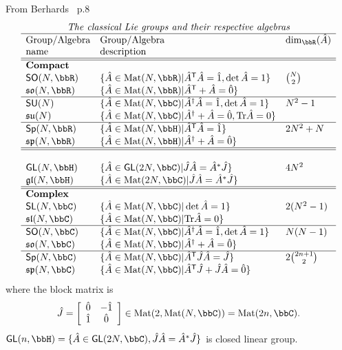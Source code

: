 From Berhards~\cite{Berhards11} p.8
 $$\begin{array}{lll}
\multicolumn{3}{c}{\textit{The classical Lie groups and their
respective algebras}}\\ \hline
 \textrm{Group/Algebra} & \textrm{Group/Algebra} & \textrm{dim}_{\bbR}(\hat{A}) \\
 \textrm{name} &\textrm{description}& \\ \hline\hline
\mathbf{Compact}& &\\
 \mathsf{SO}(N,\bbR) &\{\hat{A}\in\textrm{Mat}(N,\bbR)|\hat{A}^{\mathsf{T}}\hat{A}=\hat{1},\det\hat{A}=1\}&\binom{N}{2}\\
 \mathfrak{so}(N,\bbR) &\{\hat{A}\in\textrm{Mat}(N,\bbR)|\hat{A}^{\mathsf{T}}+\hat{A}=\hat{0}\} &\\ \hline
 \mathsf{SU}(N) &\{\hat{A}\in\textrm{Mat}(N,\bbC)|\hat{A}^{\dagger}\hat{A}=\hat{1},\det\hat{A}=1\}&N^2-1\\
 \mathfrak{su}(N) &\{\hat{A}\in\textrm{Mat}(N,\bbC)|\hat{A}^{\dagger}+\hat{A}=\hat{0},\textrm{Tr}\hat{A}=0\} &\\ \hline
 \mathsf{Sp}(N,\bbR) &\{\hat{A}\in\textrm{Mat}(N,\bbH)|\hat{A}^{\mathsf{T}}\hat{A}=\hat{1}\}&2N^2+N\\
 \mathfrak{sp}(N,\bbR) &\{\hat{A}\in\textrm{Mat}(N,\bbH)|\hat{A}^{\dagger}+\hat{A}=\hat{0}\} &\\
\hline\hline
& &\\
 \mathsf{GL}(N,\bbH) &\{\hat{A}\in\mathsf{GL}(2N,\bbC)|\hat{J}\hat{A}=\hat{A}^{*}\hat{J}\}&4N^2\\
 \mathfrak{gl}(N,\bbH) &\{\hat{A}\in\textrm{Mat}(2N,\bbC)|\hat{J}\hat{A}=\hat{A}^*\hat{J}\} &\\
\hline\hline
\mathbf{Complex}& &\\
 \mathsf{SL}(N,\bbC) &\{\hat{A}\in\textrm{Mat}(N,\bbC)|\det\hat{A}=1\}&2(N^2-1)\\
 \mathfrak{sl}(N,\bbC) &\{\hat{A}\in\textrm{Mat}(N,\bbC)|\mathrm{Tr}\hat{A}=0\} &\\ \hline
 \mathsf{SO}(N,\bbC) &\{\hat{A}\in\textrm{Mat}(N,\bbC)|\hat{A}^{\dagger}\hat{A}=\hat{1},\det\hat{A}=1\}&N(N-1)\\
 \mathfrak{so}(N,\bbC) &\{\hat{A}\in\textrm{Mat}(N,\bbC)|\hat{A}^{\dagger}+\hat{A}=\hat{0}\} &\\ \hline
 \mathsf{Sp}(N,\bbC) &\{\hat{A}\in\textrm{Mat}(N,\bbC)|\hat{A}^{\mathsf{T}}\hat{J}\hat{A}=\hat{J}\}&2\binom{2n+1}{2}\\
 \mathfrak{sp}(N,\bbC) &\{\hat{A}\in\textrm{Mat}(N,\bbC)|\hat{A}^{\mathsf{T}}\hat{J}+\hat{J}\hat{A}=\hat{0}\} &\\
\end{array}$$
where the block matrix is
\[\hat{J}=\left[\begin{array}{cc}
\hat{0}&-\hat{1}\\
\hat{1}&\hat{0}\end{array}\right]\in\textrm{Mat}(2,\textrm{Mat}(N,\bbC))=
\textrm{Mat}(2n,\bbC).
\]
$\mathsf{GL}(n,\bbH)=\{\hat{A}\in\mathsf{GL}(2N,\bbC),\hat{J}\hat{A}=\hat{A}^*\hat{J}\}$
is closed linear group.

